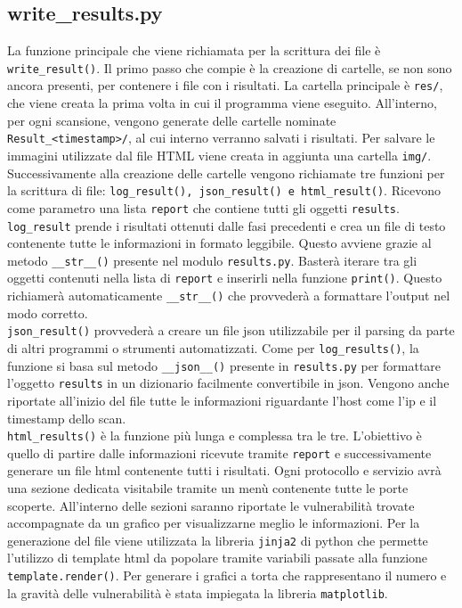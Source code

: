 \documentclass[12pt]{report}
\begin{document}
\subsection{write\_results.py}
\label{sec:write-results}

La funzione principale che viene richiamata per la scrittura dei file è \lstinline{write_result()}. Il primo passo che compie è la creazione di cartelle, se non sono ancora presenti, per contenere i file con i risultati. La cartella principale è \lstinline{res/}, che viene creata la prima volta in cui il programma viene eseguito. All'interno, per ogni scansione, vengono generate delle cartelle nominate \lstinline{Result_<timestamp>/}, al cui interno verranno salvati i risultati. Per salvare le immagini utilizzate dal file HTML viene creata in aggiunta una cartella \lstinline{img/}.\\
Successivamente alla creazione delle cartelle vengono richiamate tre funzioni per la scrittura di file: \lstinline{log_result(), json_result() e html_result()}. Ricevono come parametro una lista \lstinline{report} che contiene tutti gli oggetti \lstinline{results}.\\
\lstinline{log_result} prende i risultati ottenuti dalle fasi precedenti e crea un file di testo contenente tutte le informazioni in formato leggibile. Questo avviene grazie al metodo \lstinline{__str__()} presente nel modulo \lstinline{results.py}. Basterà iterare tra gli oggetti contenuti nella lista di \lstinline{report} e inserirli nella funzione \lstinline{print()}. Questo richiamerà automaticamente \lstinline{__str__()} che provvederà a formattare l'output nel modo corretto.\\
\lstinline{json_result()} provvederà a creare un file json utilizzabile per il parsing da parte di altri programmi o strumenti automatizzati. Come per \lstinline{log_results()}, la funzione si basa sul metodo \lstinline{__json__()} presente in \lstinline{results.py} per formattare l'oggetto \lstinline{results} in un dizionario facilmente convertibile in json. Vengono anche riportate all'inizio del file tutte le informazioni riguardante l'host come l'ip e il timestamp dello scan.\\
\lstinline{html_results()} è la funzione più lunga e complessa tra le tre. L'obiettivo è quello di partire dalle informazioni ricevute tramite \lstinline{report} e successivamente generare un file html contenente tutti i risultati. Ogni protocollo e servizio avrà una sezione dedicata visitabile tramite un menù contenente tutte le porte scoperte. All'interno delle sezioni saranno riportate le vulnerabilità trovate accompagnate da un grafico per visualizzarne meglio le informazioni. Per la generazione del file viene utilizzata la libreria \lstinline{jinja2} di python che permette l'utilizzo di template html da popolare tramite variabili passate alla funzione \lstinline{template.render()}. Per generare i grafici a torta che rappresentano il numero e la gravità delle vulnerabilità è stata impiegata la libreria \lstinline{matplotlib}.\\
\end{document}
